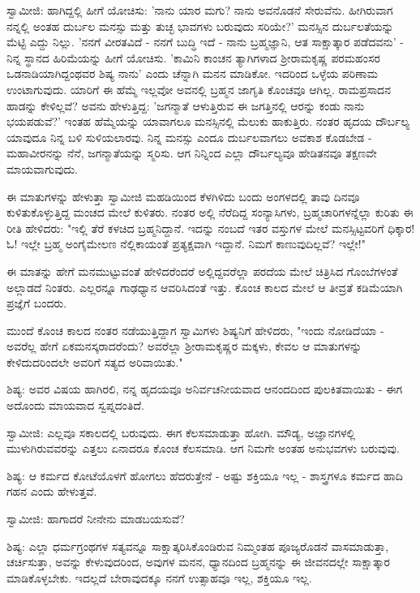 ಸ್ವಾಮೀಜಿ: ಹಾಗಿದ್ದಲ್ಲಿ ಹೀಗೆ ಯೋಚಿಸು: 'ನಾನು ಯಾರ ಮಗು? ನಾನು ಅವನೊಡನೆ ಸೇರುವೆನು. ಹೀಗಿರುವಾಗ ನನ್ನಲ್ಲಿ ಅಂತಹ ದುರ್ಬಲ ಮನಸ್ಸು ಮತ್ತು ತುಚ್ಛ ಭಾವಗಳು ಬರುವುದು ಸರಿಯೇ?' ಮನಸ್ಸಿನ ದುರ್ಬಲತೆಯನ್ನು ಮೆಟ್ಟಿ ಎದ್ದು ನಿಲ್ಲು. 'ನನಗೆ ವೀರತವಿದೆ - ನನಗೆ ಬುದ್ಧಿ ಇದೆ - ನಾನು ಬ್ರಹ್ಮಜ್ಞಾನಿ, ಆತ ಸಾಕ್ಷಾತ್ಕಾರ ಪಡೆದವನು' - ನಿನ್ನ ಸ್ಥಾನದ ಹಿರಿಮೆಯನ್ನು ಹೀಗೆ ಯೋಚಿಸು. 'ಕಾಮಿನಿ ಕಾಂಚನ ತ್ಯಾಗಿಗಳಾದ ಶ‍್ರೀರಾಮಕೃಷ್ಣ ಪರಮಹಂಸರ ಒಡನಾಡಿಯಾಗಿದ್ದಂಥವರ ಶಿಷ್ಯ ನಾನು' ಎಂದು ಚೆನ್ನಾಗಿ ಮನನ ಮಾಡಿಕೋ. ಇದರಿಂದ ಒಳ್ಳೆಯ ಪರಿಣಾಮ ಉಂಟಾಗುವುದು. ಯಾರಿಗೆ ಈ ಹೆಮ್ಮೆ ಇಲ್ಲವೋ ಅವನಲ್ಲಿ ಬ್ರಹ್ಮನ ಜಾಗೃತಿ ಕೊಂಚವೂ ಆಗಿಲ್ಲ. ರಾಮಪ್ರಸಾದನ ಹಾಡನ್ನು ಕೇಳಿಲ್ಲವೆ? ಅವನು ಹೇಳುತ್ತಿದ್ದ: 'ಜಗನ್ಮಾತೆ ಆಳುತ್ತಿರುವ ಈ ಜಗತ್ತಿನಲ್ಲಿ ಆರನ್ನು ಕಂಡು ನಾನು ಭಯಪಡುವೆ?' ಇಂತಹ ಹೆಮ್ಮೆಯನ್ನು ಯಾವಾಗಲೂ ಮನಸ್ಸಿನಲ್ಲಿ ಮೆಲುಕು ಹಾಕುತ್ತಿರು. ನಂತರ ಹೃದಯ ದೌರ್ಬಲ್ಯ ಯಾವುದೂ ನಿನ್ನ ಬಳಿ ಸುಳಿಯಲಾರವು. ನಿನ್ನ ಮನಸ್ಸು ಎಂದೂ ದುರ್ಬಲವಾಗಲು ಅವಕಾಶ ಕೊಡಬೇಡ - ಮಹಾವೀರನನ್ನು ನೆನೆ, ಜಗನ್ಮಾತೆಯನ್ನು ಸ್ಮರಿಸು. ಆಗ ನಿನ್ನಿಂದ ಎಲ್ಲಾ ದೌರ್ಬಲ್ಯವೂ ಹೇಡಿತನವೂ ತಕ್ಷಣವೇ ಮಾಯವಾಗುವುದು.

ಈ ಮಾತುಗಳನ್ನು ಹೇಳುತ್ತಾ ಸ್ವಾಮೀಜಿ ಮಹಡಿಯಿಂದ ಕೆಳಗಿಳಿದು ಬಂದು ಅಂಗಳದಲ್ಲಿ ತಾವು ದಿನವೂ ಕುಳಿತುಕೊಳ್ಳುತ್ತಿದ್ದ ಮಂಚದ ಮೇಲೆ ಕುಳಿತರು. ನಂತರ ಅಲ್ಲಿ ನೆರೆದಿದ್ದ ಸಂನ್ಯಾಸಿಗಳು, ಬ್ರಹ್ಮಚಾರಿಗಳನ್ನೆಲ್ಲಾ ಕುರಿತು ಈ ರೀತಿ ಹೇಳಿದರು: "ಇಲ್ಲಿ ತೆರೆ ಕಳಚಿದ ಬ್ರಹ್ಮನಿದ್ದಾನೆ. ಇದನ್ನು ನಂಬದೆ ಇತರ ವಸ್ತುಗಳ ಮೇಲೆ ಮನಸ್ಸಿಟ್ಟವರಿಗೆ ಧಿಕ್ಕಾರ! ಓ! ಇಲ್ಲೇ ಬ್ರಹ್ಮ ಅಂಗೈಮೇಲಣ ನೆಲ್ಲಿಕಾಯಂತೆ ಪ್ರತ್ಯಕ್ಷವಾಗಿ ಇದ್ದಾನೆ. ನಿಮಗೆ ಕಾಣುವುದಿಲ್ಲವೆ? ಇಲ್ಲೇ!"

ಈ ಮಾತನ್ನು ಹೇಗೆ ಮನಮುಟ್ಟುವಂತೆ ಹೇಳಿದರೆಂದರೆ ಅಲ್ಲಿದ್ದವರೆಲ್ಲಾ ಪರದೆಯ ಮೇಲೆ ಚಿತ್ರಿಸಿದ ಗೊಂಬೆಗಳಂತೆ ಅಲ್ಲಾಡದೆ ನಿಂತರು. ಎಲ್ಲರನ್ನೂ ಗಾಢಧ್ಯಾನ ಆವರಿಸಿದಂತೆ ಇತ್ತು. ಕೊಂಚ ಕಾಲದ ಮೇಲೆ ಆ ತೀವ್ರತೆ ಕಡಿಮೆಯಾಗಿ ಪ್ರಜ್ಞೆಗೆ ಬಂದರು.

ಮುಂದೆ ಕೊಂಚ ಕಾಲದ ನಂತರ ನಡೆಯುತ್ತಿದ್ದಾಗ ಸ್ವಾಮಿಗಳು ಶಿಷ್ಯನಿಗೆ ಹೇಳಿದರು, "ಇಂದು ನೋಡಿದೆಯಾ - ಅವರೆಲ್ಲ ಹೇಗೆ ಏಕಮನಸ್ಕರಾದರೆಂದು? ಅವರೆಲ್ಲಾ ಶ‍್ರೀರಾಮಕೃಷ್ಣರ ಮಕ್ಕಳು, ಕೇವಲ ಆ ಮಾತುಗಳನ್ನು ಕೇಳಿದುದರಿಂದಲೇ ಅವರಿಗೆ ಸತ್ಯದ ಅರಿವಾಯಿತು."

ಶಿಷ್ಯ: ಅವರ ವಿಷಯ ಹಾಗಿರಲಿ, ನನ್ನ ಹೃದಯವೂ ಅನಿರ್ವಚನೀಯವಾದ ಆನಂದದಿಂದ ಪುಲಕಿತವಾಯಿತು - ಈಗ ಅದೊಂದು ಮಾಯವಾದ ಸ್ವಪ್ನದಂತಿದೆ.

ಸ್ವಾಮೀಜಿ: ಎಲ್ಲವೂ ಸಕಾಲದಲ್ಲಿ ಬರುವುದು. ಈಗ ಕೆಲಸಮಾಡುತ್ತಾ ಹೋಗಿ. ಮೌಡ್ಯ, ಅಜ್ಞಾನಗಳಲ್ಲಿ ಮುಳುಗಿರುವವರನ್ನು ಎತ್ತಲು ಏನಾದರೂ ಕೊಂಚ ಕೆಲಸಮಾಡಿ. ಆಗ ನಿಮಗೇ ಅಂತಹ ಅನುಭವಗಳು ಬರುವುವು.

ಶಿಷ್ಯ: ಆ ಕರ್ಮದ ಕೋಟೆಯೊಳಗೆ ಹೋಗಲು ಹೆದರುತ್ತೇನೆ - ಅಷ್ಟು ಶಕ್ತಿಯೂ ಇಲ್ಲ - ಶಾಸ್ತ್ರಗಳೂ ಕರ್ಮದ ಹಾದಿ ಗಹನ ಎಂದು ಹೇಳುತ್ತವೆ.

ಸ್ವಾಮೀಜಿ: ಹಾಗಾದರೆ ನೀನೇನು ಮಾಡಬಯಸುವೆ?

ಶಿಷ್ಯ: ಎಲ್ಲಾ ಧರ್ಮಗ್ರಂಥಗಳ ಸತ್ಯವನ್ನೂ ಸಾಕ್ಷಾತ್ಕರಿಸಿಕೊಂಡಿರುವ ನಿಮ್ಮಂತಹ ಪೂಜ್ಯರೊಡನೆ ವಾಸಮಾಡುತ್ತಾ, ಚರ್ಚಿಸುತ್ತಾ, ಅವನ್ನು ಕೇಳುವುದರಿಂದ, ಅವುಗಳ ಮನನ, ಧ್ಯಾನದಿಂದ ಬ್ರಹ್ಮನನ್ನು ಈ ಜೀವನದಲ್ಲೇ ಸಾಕ್ಷಾತ್ಕಾರ ಮಾಡಿಕೊಳ್ಳಬೇಕು. ಇದಲ್ಲದೆ ಬೇರಾವುದಕ್ಕೂ ನನಗೆ ಉತ್ಸಾಹವೂ ಇಲ್ಲ, ಶಕ್ತಿಯೂ ಇಲ್ಲ.

